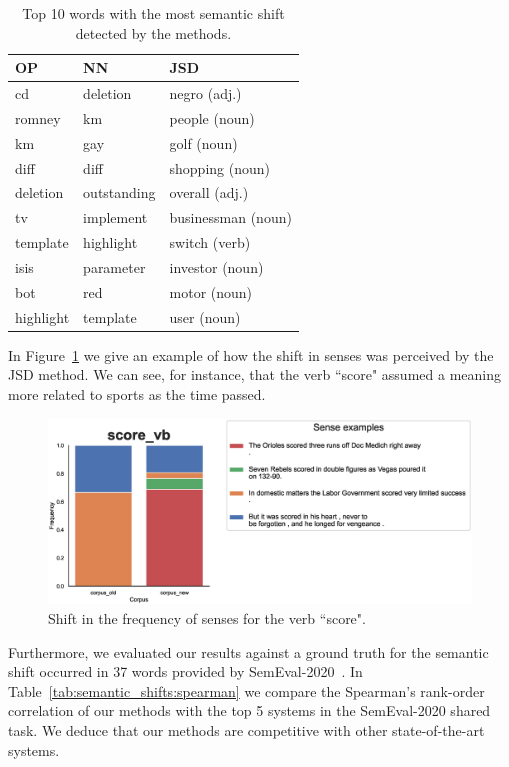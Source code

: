 \documentclass[runningheads]{llncs}
\begin{document}
\begin{table}
    \caption{Top 10 words with the most semantic shift detected by the methods.}
    \label{tab:semantic_shifts:top_words}
    \centering
    \begin{tabular}{lll}
        \toprule
        OP & NN & JSD \\
        \midrule
        cd & deletion & negro (adj.) \\
        romney & km & people (noun) \\
        km & gay & golf (noun) \\
        diff & diff & shopping (noun)  \\
        deletion & outstanding & overall (adj.) \\
        tv & implement & businessman (noun) \\
        template & highlight & switch (verb) \\
        isis & parameter & investor (noun) \\
        bot & red & motor (noun) \\
        highlight & template & user (noun) \\
        \bottomrule
    \end{tabular}
\end{table}

In Figure~\ref{fig:semantic_shifts:score} we give an example of how the shift in senses was perceived by the JSD method. We can see, for instance, that the verb “score" assumed a meaning more related to sports as the time passed.

\begin{figure}
    \center
    \includegraphics[width=1\textwidth]{img/33_score_vb.eps}
    \caption{Shift in the frequency of senses for the verb “score".} 
    \label{fig:semantic_shifts:score}
\end{figure}

Furthermore, we evaluated our results against a ground truth for the semantic shift occurred in 37 words provided by SemEval-2020~\cite{schlechtweg-etal-2020-semeval}. In Table~\ref{tab:semantic_shifts:spearman} we compare the Spearman's rank-order correlation of our methods with the top 5 systems in the SemEval-2020 shared task. We deduce that our methods are competitive with other state-of-the-art systems.
\end{document}
